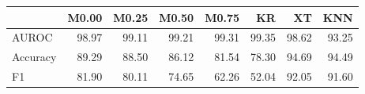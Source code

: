 \begin{tabular}{lrrrrrrr}
\toprule
 & M0.00 & M0.25 & M0.50 & M0.75 & KR & XT & KNN \\
\midrule
AUROC & 98.97 & 99.11 & 99.21 & 99.31 & 99.35 & 98.62 & 93.25 \\
Accuracy & 89.29 & 88.50 & 86.12 & 81.54 & 78.30 & 94.69 & 94.49 \\
F1 & 81.90 & 80.11 & 74.65 & 62.26 & 52.04 & 92.05 & 91.60 \\
\bottomrule
\end{tabular}
